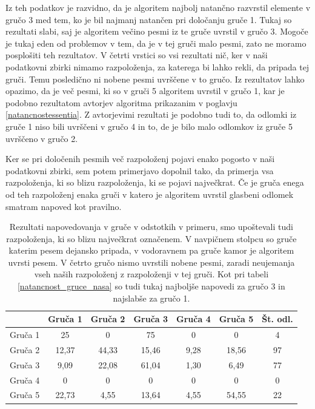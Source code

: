 \documentclass[a4paper, 12pt]{book}
\begin{document}
{Iz teh podatkov je razvidno, da je algoritem najbolj natančno razvrstil elemente v gručo 3 med tem, ko je bil najmanj natančen pri določanju gruče 1. Tukaj so rezultati slabi, saj je algoritem večino pesmi iz te gruče uvrstil v gručo 3. Mogoče je tukaj eden od problemov v tem, da je v tej gruči malo pesmi, zato ne moramo posplošiti teh rezultatov. V četrti vrstici so vsi rezultati nič, ker v naši podatkovni zbirki nimamo razpoloženja, za katerega bi lahko rekli, da pripada tej gruči. Temu posledično ni nobene pesmi uvrščene v to gručo. Iz rezultatov lahko opazimo, da je več pesmi, ki so v gruči 5 algoritem uvrstil v gručo 1, kar je podobno rezultatom avtorjev algoritma prikazanim v poglavju \ref{natancnostessentia}. Z avtorjevimi rezultati je podobno tudi to, da odlomki iz gruče 1 niso bili uvrščeni v gručo 4 in to, de je bilo malo odlomkov iz gruče 5 uvrščeno v gručo 2.

Ker se pri določenih pesmih več razpoloženj pojavi enako pogosto v naši podatkovni zbirki, sem potem primerjavo dopolnil tako, da primerja vsa razpoloženja, ki so blizu razpoloženja, ki se pojavi največkrat. Če je gruča enega od teh razpoloženj enaka gruči v katero je algoritem uvrstil glasbeni odlomek smatram napoved kot pravilno. 

\begin{table}[htb]
\begin{center}
\caption{Rezultati napovedovanja v gruče v odstotkih v primeru, smo upoštevali tudi razpoloženja, ki so blizu največkrat označenem. V navpičnem stolpcu so gruče katerim pesem dejansko pripada, v vodoravnem pa gruče kamor je algoritem uvrsti pesem. V četrto gručo nismo uvrstili nobene pesmi, zaradi neujemanja vseh naših razpoloženj z razpoloženji v tej gruči. Kot pri tabeli \ref{natancnost_gruce_nasa} so tudi tukaj najboljše napovedi za gručo 3 in najslabše za gručo 1. }
\begin{tabular}{|l|c|c|c|c|c|c|}
\hline
 & Gruča 1 & Gruča 2 & Gruča 3 & Gruča 4 & Gruča 5 & Št. odl.\\ \hline
Gruča 1 & 25 & 0	& 75 & 0 & 0 & 4\\ \hline
Gruča 2 & 12,37 & 44,33 & 15,46 & 9,28 & 18,56 & 97\\ \hline
Gruča 3 & 9,09 & 22,08 & 61,04 & 1,30 & 6,49 & 77\\ \hline
Gruča 4 & 0	& 0 & 0 & 0 & 0 & 0\\ \hline
Gruča 5 & 22,73	& 4,55 & 13,64 & 4,55 & 54,55 & 22 \\ \hline

\hline
\end{tabular}
\label{natancnost_gruce_nasa_with_second}
\end{center}
\end{table}

}
\end{document}
